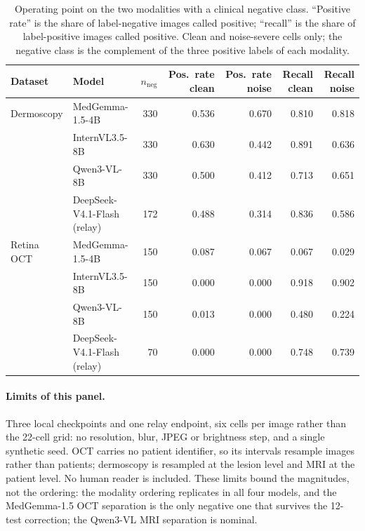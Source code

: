 \begin{table}[t]
\centering
\small
\caption{Operating point on the two modalities with a clinical negative class. ``Positive
rate'' is the share of label-negative images called positive; ``recall'' is the share of
label-positive images called positive. Clean and noise-severe cells only; the negative
class is the complement of the three positive labels of each modality.}
\label{tab:crossmodal-op4}
\begin{tabular}{l l r r r r r}
\toprule
Dataset & Model & $n_{\text{neg}}$ & Pos.\ rate clean & Pos.\ rate noise & Recall clean & Recall noise \\
\midrule
Dermoscopy & MedGemma-1.5-4B & 330 & 0.536 & 0.670 & 0.810 & 0.818 \\
           & InternVL3.5-8B & 330 & 0.630 & 0.442 & 0.891 & 0.636 \\
           & Qwen3-VL-8B & 330 & 0.500 & 0.412 & 0.713 & 0.651 \\
           & DeepSeek-V4.1-Flash (relay) & 172 & 0.488 & 0.314 & 0.836 & 0.586 \\
\midrule
Retina OCT & MedGemma-1.5-4B & 150 & 0.087 & 0.067 & 0.067 & 0.029 \\
           & InternVL3.5-8B & 150 & 0.000 & 0.000 & 0.918 & 0.902 \\
           & Qwen3-VL-8B & 150 & 0.013 & 0.000 & 0.480 & 0.224 \\
           & DeepSeek-V4.1-Flash (relay) & 70 & 0.000 & 0.000 & 0.748 & 0.739 \\
\bottomrule
\end{tabular}
\end{table}

\paragraph{Limits of this panel.} Three local checkpoints and one relay endpoint, six cells
per image rather than the 22-cell grid: no resolution, blur, JPEG or brightness step, and a
single synthetic seed. OCT carries no patient identifier, so its intervals resample images
rather than patients; dermoscopy is resampled at the lesion level and MRI at the patient
level. No human reader is included. These limits bound the magnitudes, not the ordering:
the modality ordering replicates in all four models, and the MedGemma-1.5 OCT separation
is the only negative one that survives the 12-test correction; the Qwen3-VL MRI
separation is nominal.
